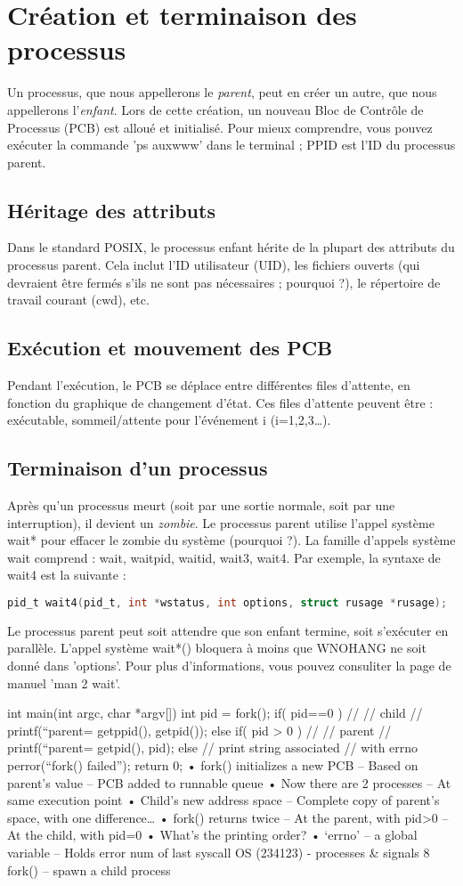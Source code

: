 \documentclass[12pt]{report}
\begin{document}
\section{Création et terminaison des processus}Un processus, que nous appellerons le \textit{parent}, peut en créer un autre, que nous appellerons l'\textit{enfant}. Lors de cette création, un nouveau Bloc de Contrôle de Processus (PCB) est alloué et initialisé. Pour mieux comprendre, vous pouvez exécuter la commande 'ps auxwww' dans le terminal ; PPID est l'ID du processus parent.\subsection{Héritage des attributs}Dans le standard POSIX, le processus enfant hérite de la plupart des attributs du processus parent. Cela inclut l'ID utilisateur (UID), les fichiers ouverts (qui devraient être fermés s'ils ne sont pas nécessaires ; pourquoi ?), le répertoire de travail courant (cwd), etc.\subsection{Exécution et mouvement des PCB}Pendant l'exécution, le PCB se déplace entre différentes files d'attente, en fonction du graphique de changement d'état. Ces files d'attente peuvent être : exécutable, sommeil/attente pour l'événement i (i=1,2,3…).\subsection{Terminaison d'un processus}Après qu'un processus meurt (soit par une sortie normale, soit par une interruption), il devient un \textit{zombie}. Le processus parent utilise l'appel système wait* pour effacer le zombie du système (pourquoi ?). La famille d'appels système wait comprend : wait, waitpid, waitid, wait3, wait4. Par exemple, la syntaxe de wait4 est la suivante :\begin{lstlisting}[language=C]pid_t wait4(pid_t, int *wstatus, int options, struct rusage *rusage);\end{lstlisting}Le processus parent peut soit attendre que son enfant termine, soit s'exécuter en parallèle. L'appel système wait*() bloquera à moins que WNOHANG ne soit donné dans 'options'. Pour plus d'informations, vous pouvez consuliter la page de manuel 'man 2 wait'.  

int main(int argc, char *argv[])
{
  int pid = fork();
  if( pid==0 ) { 
   //
   // child
      //
      printf(“parent=%
             getppid(), getpid());
  }
  else if( pid > 0 ) {
      //
      // parent
      //
      printf(“parent=%
             getpid(), pid);
  }
  else { // print string associated
         // with errno   
      perror(“fork() failed”); 
  }
  return 0;
}
• fork() initializes a new PCB
– Based on parent’s value
– PCB added to runnable queue
• Now there are 2 processes
– At same execution point
• Child’s new address space 
– Complete copy of parent’s 
space, with one difference…
• fork() returns twice
– At the parent, with pid>0
– At the child, with pid=0
• What’s the printing order?
• ‘errno’ – a global variable
– Holds error num of last syscall
OS (234123) - processes & signals
8
fork() – spawn a child process
\end{document}
